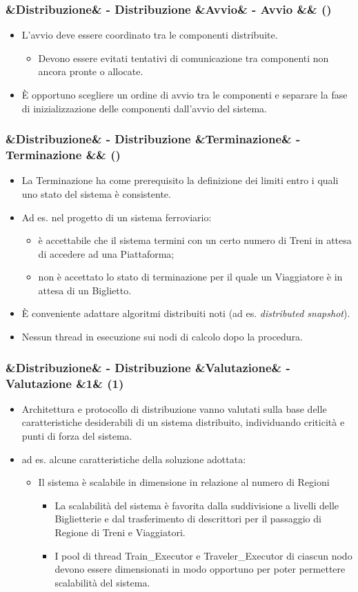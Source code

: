 \documentclass[slidestop,compress,blackandwhite]{beamer}
\newcommand{\ii}[1]{\textit{#1}}
\newcommand{\cm}[1]{\vspace{#1cm}}
\newcommand{\newtitle}[4]{
	#1 
	\ifx&#2&%
	\else
  		\large- #2
	\fi
	\ifx&#3&%
	\else
  		\small- #3
	\fi
	\ifx&#4&%
	\else
  		\normalsize (#4)
	\fi
}
\newcommand{\newframe}[5]{
	\begin{frame}
		\frametitle{\newtitle{#1}{#2}{#3}{#4}}
		#5
	\end{frame}
}
\newcommand{\myitemize}[1]{
	\begin{itemize}\itemsep4pt
	#1
	\end{itemize}
}
\begin{document}
	\newframe{}{Distribuzione}{Avvio}{}{
		\cm{0.5}
		\justifying
		\myitemize{
			\item L'avvio deve essere coordinato tra le componenti distribuite.
				\cm{0.3}
				\myitemize {
					\item Devono essere evitati tentativi di comunicazione tra componenti non ancora pronte o allocate.
				}
				\cm{0.3}
			\item \`E opportuno scegliere un ordine di avvio tra le componenti e separare la fase di inizializzazione delle componenti dall'avvio del sistema.
		}
		
	}
	
	\newframe{}{Distribuzione}{Terminazione}{}{
		\cm{0.5}
		\myitemize{
			\item La Terminazione ha come prerequisito la definizione dei limiti entro i quali uno stato del sistema è consistente. 
			\item Ad es. nel progetto di un sistema ferroviario:
				\myitemize {
					\item è accettabile che il sistema termini con un certo numero di Treni in attesa di accedere ad una Piattaforma;
					\item non è accettato lo stato di terminazione per il quale un Viaggiatore è in attesa di un Biglietto.
				}
			\item \`E conveniente adattare algoritmi distribuiti noti (ad es. \ii{distributed snapshot}).
			\item Nessun thread in esecuzione sui nodi di calcolo dopo la procedura.
		}
	}
	
	\newframe{}{Distribuzione}{Valutazione}{1}{
		\myitemize {
			\item Architettura e protocollo di distribuzione vanno valutati sulla base delle caratteristiche desiderabili di un sistema distribuito, individuando criticità e punti di forza del sistema.
			\item ad es. alcune caratteristiche della soluzione adottata:\\
				\myitemize {
					\item Il sistema è scalabile in dimensione in relazione al numero di Regioni\\
						\myitemize {
							\item La scalabilità del sistema è favorita dalla suddivisione a livelli delle Biglietterie e dal trasferimento di descrittori per il passaggio di Regione di Treni e Viaggiatori.
							\item I pool di thread Train\_Executor e Traveler\_Executor di ciascun nodo devono essere dimensionati in modo opportuno per poter permettere scalabilità del sistema.
						}
				}
		}
	}
	
\end{document}
